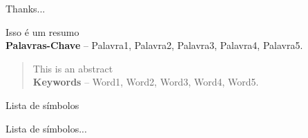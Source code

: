\capa
{}








\begin{agradecimentos}

Thanks...

\end{agradecimentos}




\begin{resumo}
    Isso é um resumo
    \\[3\baselineskip]
    \textbf{Palavras-Chave} -- Palavra1, Palavra2, Palavra3, Palavra4, Palavra5.
\end{resumo}


\begin{abstract}
    This is an abstract
    \\[3\baselineskip]
    \textbf{Keywords} -- Word1, Word2, Word3, Word4, Word5.
\end{abstract}


\listadefiguras
\listadetabelas

\begin{pretextualsection}{Lista de símbolos}

Lista de símbolos...

\end{pretextualsection}

\sumario